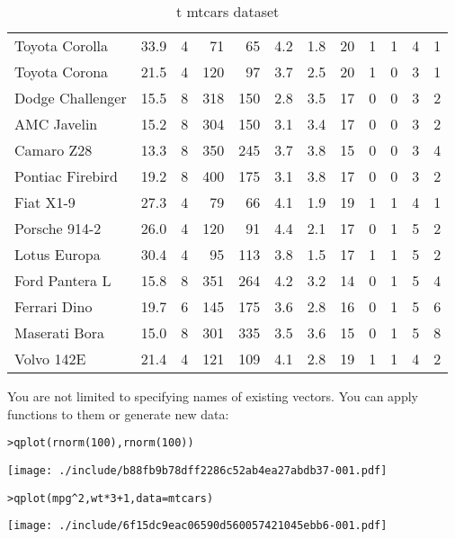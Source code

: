 \begin{table}[ht]
\begin{center}
\begin{tabular}{l|rrrrrrrrrrr}
Toyota Corolla & 33.9 & 4 & 71 & 65 & 4.2 & 1.8 & 20 & 1 & 1 & 4 & 1 \\
Toyota Corona & 21.5 & 4 & 120 & 97 & 3.7 & 2.5 & 20 & 1 & 0 & 3 & 1 \\
Dodge Challenger & 15.5 & 8 & 318 & 150 & 2.8 & 3.5 & 17 & 0 & 0 & 3 & 2 \\
AMC Javelin & 15.2 & 8 & 304 & 150 & 3.1 & 3.4 & 17 & 0 & 0 & 3 & 2 \\
Camaro Z28 & 13.3 & 8 & 350 & 245 & 3.7 & 3.8 & 15 & 0 & 0 & 3 & 4 \\
Pontiac Firebird & 19.2 & 8 & 400 & 175 & 3.1 & 3.8 & 17 & 0 & 0 & 3 & 2 \\
Fiat X1-9 & 27.3 & 4 & 79 & 66 & 4.1 & 1.9 & 19 & 1 & 1 & 4 & 1 \\
Porsche 914-2 & 26.0 & 4 & 120 & 91 & 4.4 & 2.1 & 17 & 0 & 1 & 5 & 2 \\
Lotus Europa & 30.4 & 4 & 95 & 113 & 3.8 & 1.5 & 17 & 1 & 1 & 5 & 2 \\
Ford Pantera L & 15.8 & 8 & 351 & 264 & 4.2 & 3.2 & 14 & 0 & 1 & 5 & 4 \\
Ferrari Dino & 19.7 & 6 & 145 & 175 & 3.6 & 2.8 & 16 & 0 & 1 & 5 & 6 \\
Maserati Bora & 15.0 & 8 & 301 & 335 & 3.5 & 3.6 & 15 & 0 & 1 & 5 & 8 \\
Volvo 142E & 21.4 & 4 & 121 & 109 & 4.1 & 2.8 & 19 & 1 & 1 & 4 & 2 \\
\hline
\end{tabular}
\caption{{	t mtcars} dataset}
\label{tab:mtcars}
\end{center}
\end{table}
\clearpage

You are not limited to specifying names of existing vectors.  You can apply functions to them or generate new data:

\begin{alltt}
> qplot(rnorm(100), rnorm(100))
\end{alltt}
\texttt{[image: ./include/b88fb9b78dff2286c52ab4ea27abdb37-001.pdf]}
\begin{alltt}

> qplot(mpg^2, wt * 3 + 1, data = mtcars)
\end{alltt}
\texttt{[image: ./include/6f15dc9eac06590d560057421045ebb6-001.pdf]}
\begin{alltt}

\end{alltt}

